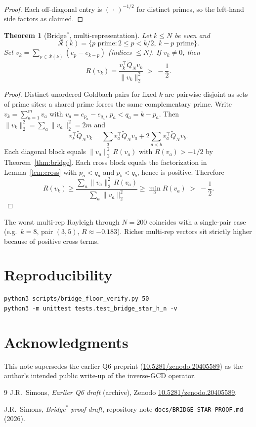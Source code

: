 \documentclass[11pt]{article}
\newtheorem{theorem}{Theorem}[section]
\newcommand{\Qt}{\widetilde{Q}}
\begin{document}
\begin{proof}
Each off-diagonal entry is $(\,\cdot\,)^{-1/2}$ for distinct primes, so the
left-hand side factors as claimed.
\end{proof}

\begin{theorem}[Bridge$^*$, multi-representation]\label{thm:multirep}
Let $k\le N$ be even and
\[
\mathcal{R}(k)=\{p\text{ prime}:2\le p<k/2,\ k-p\text{ prime}\}.
\]
Set $v_k=\sum_{p\in\mathcal{R}(k)}(e_p-e_{k-p})$ (indices $\le N$).
If $v_k\neq 0$, then
\[
R(v_k)=\frac{v_k^\top\Qt_N v_k}{\|v_k\|_2^2}
\;>\;-\frac12.
\]
\end{theorem}

\begin{proof}
Distinct unordered Goldbach pairs for fixed $k$ are pairwise disjoint as
sets of prime sites: a shared prime forces the same complementary prime.
Write $v_k=\sum_{a=1}^{m}v_a$ with $v_a=e_{p_a}-e_{q_a}$, $p_a<q_a=k-p_a$.
Then $\|v_k\|_2^2=\sum_a\|v_a\|_2^2=2m$ and
\[
v_k^\top\Qt_N v_k
=\sum_a v_a^\top\Qt_N v_a
+2\sum_{a<b}v_a^\top\Qt_N v_b.
\]
Each diagonal block equals $\|v_a\|_2^2\,R(v_a)$ with $R(v_a)>-1/2$ by
Theorem~\ref{thm:bridge}. Each cross block equals the factorization in
Lemma~\ref{lem:cross} with $p_a<q_a$ and $p_b<q_b$, hence is positive.
Therefore
\[
R(v_k)
\ge\frac{\sum_a\|v_a\|_2^2\,R(v_a)}{\sum_a\|v_a\|_2^2}
\ge\min_a R(v_a)
\;>\;-\frac12.
\]
\end{proof}

\begin{remark}
The worst multi-rep Rayleigh through $N=200$ coincides with a single-pair
case (e.g.\ $k=8$, pair $(3,5)$, $R\approx-0.183$). Richer multi-rep
vectors sit strictly higher because of positive cross terms.
\end{remark}

\section*{Reproducibility}

\begin{verbatim}
python3 scripts/bridge_floor_verify.py 50
python3 -m unittest tests.test_bridge_star_h_n -v
\end{verbatim}

\section*{Acknowledgments}
This note supersedes the earlier Q6 preprint
(\href{https://doi.org/10.5281/zenodo.20405589}{10.5281/zenodo.20405589})
as the author's intended public write-up of the inverse-GCD operator.

\begin{thebibliography}{9}
J.R.~Simons,
\textit{Earlier Q6 draft} (archive),
Zenodo \href{https://doi.org/10.5281/zenodo.20405589}{10.5281/zenodo.20405589}.

J.R.~Simons,
\textit{Bridge$^*$ proof draft},
repository note \texttt{docs/BRIDGE-STAR-PROOF.md} (2026).
\end{thebibliography}
\end{document}
